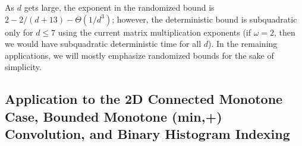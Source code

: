 \documentclass[11pt]{article}
\newcommand{\OO}{\widetilde{O}}
\newcommand{\IGNORE}[1]{}
\begin{document}
\IGNORE{
For example, for $d=2$, the randomized time bound is
$\OO(n^{(9+\sqrt{177})/12})=O(n^{1.859})$ (attained
by setting $\ell \approx n^{0.0707}$ and $1/\alpha\approx n^{0.1313}$)
and the
deterministic time bound is $O(n^{1.864})$ (attained
by setting $\ell \approx n^{0.2353}$ and $1/\alpha \approx n^{0.1046}$).
}
As $d$ gets
large, the exponent in the randomized bound is
$2-2/(d+13) - \Theta(1/d^3)$; however, the deterministic bound
is subquadratic only for $d\le 7$ using
the current matrix multiplication exponents
(if $\omega=2$, then we would have subquadratic deterministic
time for all $d$).
In the remaining applications, we will mostly emphasize randomized bounds for the sake of simplicity.

\IGNORE{

w := 2.3728639;
r := 0.30298;
mu := (3-r-w)/(1-r);
d := 2;
solve({z = mu*y+w*t, z = -y+2*t+(1-t)*z, z = 6*y + t + d*(1-t)});

w := 2.3728639;
r := 0.30298;
mu := (3-r-w)/(1-r);
z := proc(d)  a := 6-mu; b := d*(1+mu)-13+w+2*mu; c := -d*(w+2*mu);
              (-b + sqrt(b^2 - 4*a*c))/(2*a); end;
> z(2);
                           1.863158551

> z(3);
                           1.900083074

> z(4);
                           1.929989472

> z(5);
                           1.954841478

> z(6);
                           1.975898027

> z(7);
                           1.994013663

> z(8);
                           2.009793911

}


\subsection{Application to the 2D Connected Monotone Case,
Bounded Monotone (min,+) Convolution, and
Binary Histogram Indexing}\label{sec:mono:appl}
\end{document}
